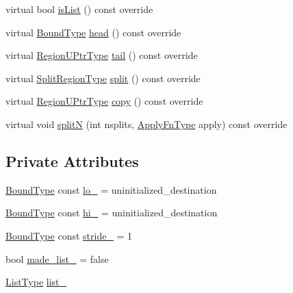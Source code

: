 \begin{DoxyCompactItemize}
\item 
virtual bool \hyperlink{structvt_1_1group_1_1region_1_1_range_aaa2df0017d61507802bcc90a88fcda91}{is\+List} () const override
\item 
virtual \hyperlink{structvt_1_1group_1_1region_1_1_region_abf426ff85bed72c1c6524fad6a9f1751}{Bound\+Type} \hyperlink{structvt_1_1group_1_1region_1_1_range_ab6abce20eb32475d0ae734770b6586c0}{head} () const override
\item 
virtual \hyperlink{structvt_1_1group_1_1region_1_1_region_ae5f42cf159116a3cf8bd65423eb01037}{Region\+U\+Ptr\+Type} \hyperlink{structvt_1_1group_1_1region_1_1_range_a409f171c688707fa71e4aea1099ce691}{tail} () const override
\item 
virtual \hyperlink{structvt_1_1group_1_1region_1_1_region_ab8d05c0978c7f38292a9ed5a15498a4b}{Split\+Region\+Type} \hyperlink{structvt_1_1group_1_1region_1_1_range_a0d2542edc1fccecc5ba898484f0ccd3f}{split} () const override
\item 
virtual \hyperlink{structvt_1_1group_1_1region_1_1_region_ae5f42cf159116a3cf8bd65423eb01037}{Region\+U\+Ptr\+Type} \hyperlink{structvt_1_1group_1_1region_1_1_range_a9b7985ec60471524e11bb933fd0f6821}{copy} () const override
\item 
virtual void \hyperlink{structvt_1_1group_1_1region_1_1_range_a6fcfec2c3fabe024559c2f278a8d12e5}{splitN} (int nsplits, \hyperlink{structvt_1_1group_1_1region_1_1_region_a7c9e99b1157d2fe2f3e6fc36a1463a96}{Apply\+Fn\+Type} apply) const override
\end{DoxyCompactItemize}
\subsection*{Private Attributes}
\begin{DoxyCompactItemize}
\item 
\hyperlink{structvt_1_1group_1_1region_1_1_region_abf426ff85bed72c1c6524fad6a9f1751}{Bound\+Type} const \hyperlink{structvt_1_1group_1_1region_1_1_range_aa5903785818d44ac6bc7a85ff61664f3}{lo\+\_\+} = uninitialized\+\_\+destination
\item 
\hyperlink{structvt_1_1group_1_1region_1_1_region_abf426ff85bed72c1c6524fad6a9f1751}{Bound\+Type} const \hyperlink{structvt_1_1group_1_1region_1_1_range_ac4a27a2eba9f7efc7d96beb12cecdc04}{hi\+\_\+} = uninitialized\+\_\+destination
\item 
\hyperlink{structvt_1_1group_1_1region_1_1_region_abf426ff85bed72c1c6524fad6a9f1751}{Bound\+Type} const \hyperlink{structvt_1_1group_1_1region_1_1_range_ad483fd4ac3bb38c69501fd95cef3890c}{stride\+\_\+} = 1
\item 
bool \hyperlink{structvt_1_1group_1_1region_1_1_range_aa0193a445bff44cfb5c27864d485ce97}{made\+\_\+list\+\_\+} = false
\item 
\hyperlink{structvt_1_1group_1_1region_1_1_region_a4e35b2fc6dca06aca0b7bc0e19b35c5a}{List\+Type} \hyperlink{structvt_1_1group_1_1region_1_1_range_a6f0b75bfcf63316d937430e2a49fb79f}{list\+\_\+}
\end{DoxyCompactItemize}
